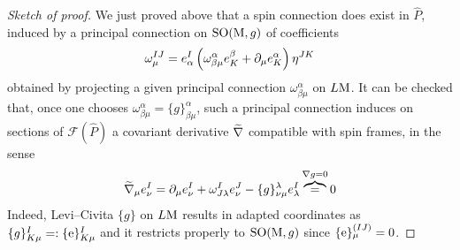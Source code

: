 \begin{proof}[Sketch of proof]
    We just proved above that a spin connection does exist in $\widehat{P}$, induced by a principal connection on $\text{\normalfont SO}(\text{\normalfont M},g)$ of coefficients
    $$\omega^{IJ}_\mu=e^I_\alpha\left(\omega^\alpha_{\beta\mu}e^\beta_K+\partial_\mu e^\alpha_K\right)\eta^{JK}$$
    obtained by projecting a given principal connection $\omega^\alpha_{\beta\mu}$ on $L\text{\normalfont M}$. It can be checked that, once one chooses $\omega^\alpha_{\beta\mu}=\{g\}^\alpha_{\beta\mu}$, such a principal connection induces on sections of $\mathcal{F}(\widehat{P})$ a covariant derivative $\widetilde{\nabla}$ compatible with spin frames, in the sense 
    $$\widetilde{\nabla}_\mu e^I_\nu=\partial_\mu e_\nu^I+\omega^I_{J\lambda}e^J_\nu-\{g\}^\lambda_{\nu\mu}e_\lambda^I\overbrace{=}^{\nabla g=0}0$$
    Indeed, Levi--Civita $\{g\}$ on $L\text{\normalfont M}$ results in adapted coordinates as $\{g\}^I_{K\mu}=:\{\text{\normalfont e}\}^I_{K\mu}$ and it restricts properly to $\text{\normalfont SO}(\text{\normalfont M},g)$ since $\{\text{\normalfont e}\}^{(IJ)}_\mu=0$.
\end{proof}


